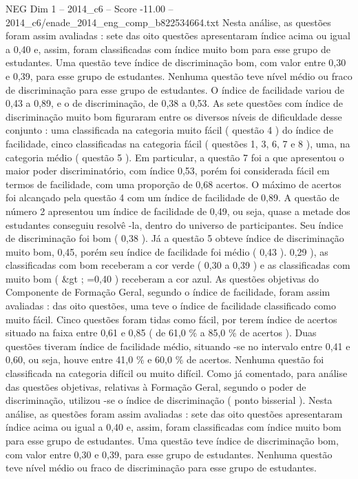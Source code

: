 \begin{textsample}{NEG Dim 1 – 2014\_c6 – Score -11.00 – 2014\_c6/enade\_2014\_eng\_comp\_b822534664.txt}
Nesta análise, as questões foram assim avaliadas : sete das oito questões apresentaram índice acima ou igual a 0,40 e, assim, foram classificadas com índice muito bom para esse grupo de estudantes.
Uma questão teve índice de discriminação bom, com valor entre 0,30 e 0,39, para esse grupo de estudantes.
Nenhuma questão teve nível médio ou fraco de discriminação para esse grupo de estudantes.
O índice de facilidade variou de 0,43 a 0,89, e o de discriminação, de 0,38 a 0,53.
As sete questões com índice de discriminação muito bom figuraram entre os diversos níveis de dificuldade desse conjunto : uma classificada na categoria muito fácil ( questão 4 ) do índice de facilidade, cinco classificadas na categoria fácil ( questões 1, 3, 6, 7 e 8 ), uma, na categoria médio ( questão 5 ).
Em particular, a questão 7 foi a que apresentou o maior poder discriminatório, com índice 0,53, porém foi considerada fácil em termos de facilidade, com uma proporção de 0,68 acertos.
O máximo de acertos foi alcançado pela questão 4 com um índice de facilidade de 0,89.
A questão de número 2 apresentou um índice de facilidade de 0,49, ou seja, quase a metade dos estudantes conseguiu resolvê -la, dentro do universo de participantes.
Seu índice de discriminação foi bom ( 0,38 ).
Já a questão 5 obteve índice de discriminação muito bom, 0,45, porém seu índice de facilidade foi médio ( 0,43 ). 0,29 ), as classificadas com bom receberam a cor verde ( 0,30 a 0,39 ) e as classificadas com muito bom ( \&gt ; =0,40 ) receberam a cor azul.
As questões objetivas do Componente de Formação Geral, segundo o índice de facilidade, foram assim avaliadas : das oito questões, uma teve o índice de facilidade classificado como muito fácil.
Cinco questões foram tidas como fácil, por terem índice de acertos situado na faixa entre 0,61 e 0,85 ( de 61,0 \% a 85,0 \% de acertos ).
Duas questões tiveram índice de facilidade médio, situando -se no intervalo entre 0,41 e 0,60, ou seja, houve entre 41,0 \% e 60,0 \% de acertos.
Nenhuma questão foi classificada na categoria difícil ou muito difícil.
Como já comentado, para análise das questões objetivas, relativas à Formação Geral, segundo o poder de discriminação, utilizou -se o índice de discriminação ( ponto bisserial ).
Nesta análise, as questões foram assim avaliadas : sete das oito questões apresentaram índice acima ou igual a 0,40 e, assim, foram classificadas com índice muito bom para esse grupo de estudantes.
Uma questão teve índice de discriminação bom, com valor entre 0,30 e 0,39, para esse grupo de estudantes.
Nenhuma questão teve nível médio ou fraco de discriminação para esse grupo de estudantes.

\end{textsample}
